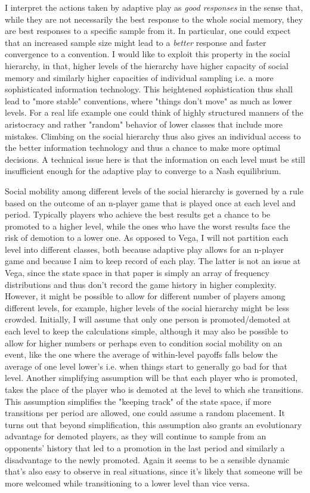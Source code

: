\documentclass[11pt, a4paper, leqno]{article}
\begin{document}
I interpret the actions taken by adaptive play as \textit{good responses} in the sense that, while they are not necessarily the best response to the whole social memory, they are best responses to a specific sample from it. In particular, one could expect that an increased sample size might lead to a \textit{better} response and faster convergence to a convention. I would like to exploit this property in the social hierarchy, in that, higher levels of the hierarchy have higher capacity of social memory and similarly higher capacities of individual sampling i.e. a more sophisticated information technology. This heightened sophistication thus shall lead to "more stable" conventions, where "things don't move" as much as lower levels. For a real life example one could think of highly structured manners of the aristocracy and rather "random" behavior of lower classes that include more mistakes. Climbing on the social hierarchy thus also gives an individual access to the better information technology and thus a chance to make more optimal decisions. A technical issue here is that the information on each level must be still insufficient enough for the adaptive play to converge to a Nash equilibrium.

Social mobility among different levels of the social hierarchy is governed by a rule based on the outcome of an n-player game that is played once at each level and period. Typically players who achieve the best results get a chance to be promoted to a higher level, while the ones who have the worst results face the risk of demotion to a lower one. As opposed to Vega, I will not partition each level into different classes, both because adaptive play allows for an n-player game and because I aim to keep record of each play. The latter is not an issue at Vega, since the state space in that paper is simply an array of frequency distributions and thus don't record the game history in higher complexity. However, it might be possible to allow for different number of players among different levels, for example, higher levels of the social hierarchy might be less crowded. Initially, I will assume that only one person is promoted/demoted at each level to keep the calculations simple, although it may also be possible to allow for higher numbers or perhaps even to condition social mobility on an event, like the one where the average of within-level payoffs falls below the average of one level lower's i.e. when things start to generally go bad for that level. Another simplifying assumption will be that each player who is promoted, takes the place of the player who is demoted at the level to which she transitions. This assumption simplifies the "keeping track" of the state space, if more transitions per period are allowed, one could assume a random placement. It turns out that beyond simplification, this assumption also grants an evolutionary advantage for demoted players, as they will continue to sample from an opponents' history that led to a promotion in the last period and similarly a disadvantage to the newly promoted. Again it seems to be a sensible dynamic that's also easy to observe in real situations, since it's likely that someone will be more welcomed while transitioning to a lower level than vice versa.
\end{document}
